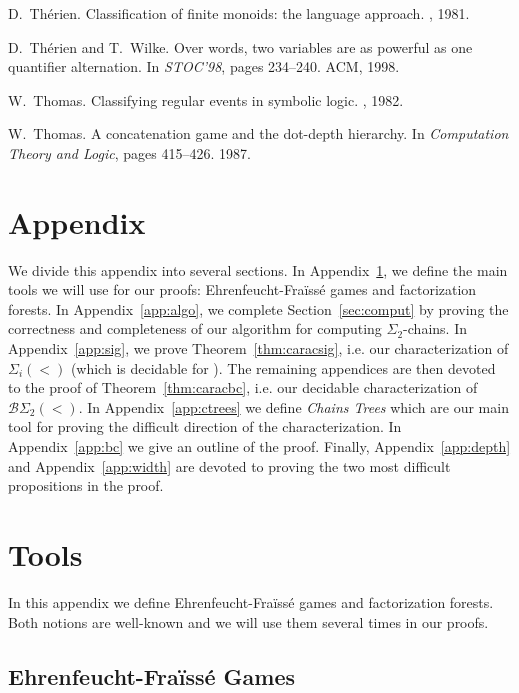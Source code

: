 \documentclass[envcountsame]{llncs}
\newcommand{\efgame}{Ehrenfeucht-Fra\"iss\'e\xspace}
\newcommand{\sic}[1]{\ensuremath{\Sigma_{#1}}\xspace}
\newcommand{\siw}[1]{\ensuremath{\Sigma_{#1}(<)}\xspace}
\newcommand{\bswd}{\ensuremath{\mathcal{B}\Sigma_{2}(<)}\xspace}
\newcommand\qchains[1]{\ensuremath{\sic{#1}}-chains\xspace}
\newcommand\Chains{Chains\xspace}
\newcommand\dchains{\qchains{2}}
\begin{document}
\begin{thebibliography}{10}
D.~Th{\'e}rien.
\newblock Classification of finite monoids: the language approach.
, 1981.

D.~Th\'{e}rien and T.~Wilke.
\newblock Over words, two variables are as powerful as one quantifier
  alternation.
\newblock In {\em STOC'98}, pages 234--240. ACM, 1998.

W.~Thomas.
\newblock Classifying regular events in symbolic logic.
, 1982.

W.~Thomas.
\newblock A concatenation game and the dot-depth hierarchy.
\newblock In {\em Computation Theory and Logic}, pages 415--426. 1987.

\end{thebibliography}

\appendix
\newpage

\section*{Appendix}
We divide this appendix into several sections. In Appendix~\ref{app:facto}, we
define the main tools we will use for our proofs: \efgame games and
factorization forests.  In Appendix~\ref{app:algo}, we complete
Section~\ref{sec:comput} by proving the correctness and completeness of our
algorithm for computing \dchains. In Appendix~\ref{app:sig}, we prove
Theorem~\ref{thm:caracsig}, i.e. our characterization of \siw{i} (which is
decidable for ). The remaining appendices are then devoted to the
proof of Theorem~\ref{thm:caracbc}, i.e. our decidable characterization of
\bswd. In Appendix~\ref{app:ctrees} we define \emph{\Chains Trees} which are
our main tool for proving the difficult direction of the characterization. In
Appendix~\ref{app:bc} we give an outline of the proof. Finally,
Appendix~\ref{app:depth} and Appendix~\ref{app:width} are devoted to proving
the two most difficult propositions in the proof.

\section{Tools}
\label{app:facto}
In this appendix we define \efgame games and factorization
forests. Both notions are well-known and we will use them
several times in our proofs.

\subsection{\efgame Games}
\end{document}

